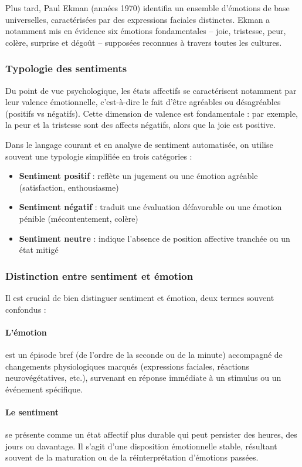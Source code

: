 Plus tard, Paul Ekman (années 1970) identifia un ensemble d'émotions de base universelles, caractérisées par des expressions faciales distinctes. Ekman a notamment mis en évidence six émotions fondamentales – joie, tristesse, peur, colère, surprise et dégoût – supposées reconnues à travers toutes les cultures.

\subsubsection{Typologie des sentiments}

Du point de vue psychologique, les états affectifs se caractérisent notamment par leur valence émotionnelle, c'est-à-dire le fait d'être agréables ou désagréables (positifs vs négatifs). Cette dimension de valence est fondamentale : par exemple, la peur et la tristesse sont des affects négatifs, alors que la joie est positive.

Dans le langage courant et en analyse de sentiment automatisée, on utilise souvent une typologie simplifiée en trois catégories :

\begin{itemize}
    \item \textbf{Sentiment positif} : reflète un jugement ou une émotion agréable (satisfaction, enthousiasme)
    \item \textbf{Sentiment négatif} : traduit une évaluation défavorable ou une émotion pénible (mécontentement, colère)
    \item \textbf{Sentiment neutre} : indique l'absence de position affective tranchée ou un état mitigé
\end{itemize}

\subsubsection{Distinction entre sentiment et émotion}

Il est crucial de bien distinguer sentiment et émotion, deux termes souvent confondus :

\paragraph{L'émotion} est un épisode bref (de l'ordre de la seconde ou de la minute) accompagné de changements physiologiques marqués (expressions faciales, réactions neurovégétatives, etc.), survenant en réponse immédiate à un stimulus ou un événement spécifique.

\paragraph{Le sentiment} se présente comme un état affectif plus durable qui peut persister des heures, des jours ou davantage. Il s'agit d'une disposition émotionnelle stable, résultant souvent de la maturation ou de la réinterprétation d'émotions passées.

